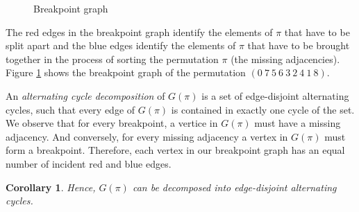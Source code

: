 \documentclass[11pt,DIV=11]{scrartcl}
\newtheorem{corollary}{Corollary}[theorem]
\theoremstyle{definition}
\theoremstyle{remark}
\begin{document}
\begin{figure}
    \centering
    \caption{Breakpoint graph}
    \label{fig:breakpoint_graph}
\end{figure}

The red edges in the breakpoint graph identify the elements of $\pi$ that have to be split apart and the blue edges identify the elements of $\pi$ that have to be brought together in the process of sorting the permutation $\pi$ (the missing adjacencies). Figure \ref{fig:breakpoint_graph} shows the breakpoint graph of the permutation $(0\ 7\ 5\ 6\ 3\ 2\ 4\ 1\ 8)$.

An \textit{alternating cycle decomposition} of $G(\pi)$ is a set of edge-disjoint alternating cycles, such that every edge of $G(\pi)$ is contained in exactly one cycle of the set. We observe that for every breakpoint, a vertice in $G(\pi)$ must have a missing adjacency. And conversely, for every missing adjacency a vertex in $G(\pi)$ must form a breakpoint. Therefore, each vertex in our breakpoint graph has an equal number of incident red and blue edges.

\begin{corollary}
Hence, $G(\pi)$ can be decomposed into edge-disjoint alternating cycles.
\end{corollary}
\end{document}
